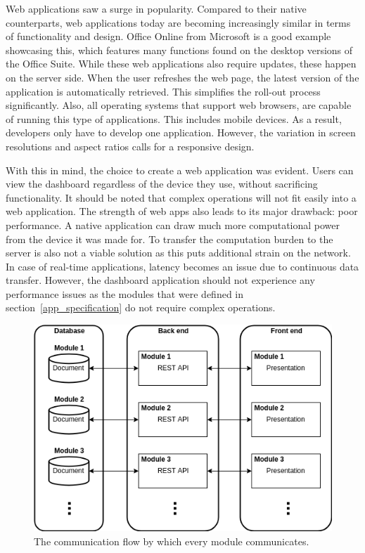     Web applications saw a surge in popularity. Compared to their native counterparts, web applications today are becoming increasingly similar in terms of functionality and design. Office Online from Microsoft is a good example showcasing this, which features many functions found on the desktop versions of the Office Suite. While these web applications also require updates, these happen on the server side. When the user refreshes the web page, the latest version of the application is automatically retrieved. This simplifies the roll-out process significantly. Also, all operating systems that support web browsers, are capable of running this type of applications. This includes mobile devices. As a result, developers only have to develop one application. However, the variation in screen resolutions and aspect ratios calls for a responsive design.

    With this in mind, the choice to create a web application was evident. Users can view the dashboard regardless of the device they use, without sacrificing functionality. It should be noted that complex operations will not fit easily into a web application. The strength of web apps also leads to its major drawback: poor performance. A native application can draw much more computational power from the device it was made for. To transfer the computation burden to the server is also not a viable solution as this puts additional strain on the network. In case of real-time applications, latency becomes an issue due to continuous data transfer. However, the dashboard application should not experience any performance issues as the modules that were defined in section~\ref{app_specification} do not require complex operations.

    \begin{figure}[!t]
        \centering
        \includegraphics[width=1\textwidth]{chapters/4_implementation/structure}
        \caption{The communication flow by which every module communicates.}\label{fig:structure}
    \end{figure}

